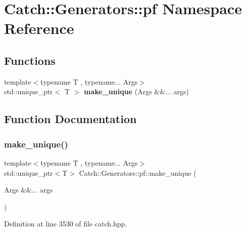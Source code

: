 \section{Catch\+::Generators\+::pf Namespace Reference}
\label{namespace_catch_1_1_generators_1_1pf}
\subsection*{Functions}
\begin{DoxyCompactItemize}
\item 
{\footnotesize template$<$typename T , typename... Args$>$ }\\std\+::unique\+\_\+ptr$<$ T $>$ \textbf{ make\+\_\+unique} (Args \&\&... args)
\end{DoxyCompactItemize}


\subsection{Function Documentation}
\mbox{\label{namespace_catch_1_1_generators_1_1pf_adb71cb1098062f6baaf86ec4feadae7d}} 
\subsubsection{make\_unique()}
{\footnotesize\ttfamily template$<$typename T , typename... Args$>$ \\
std\+::unique\+\_\+ptr$<$T$>$ Catch\+::\+Generators\+::pf\+::make\+\_\+unique (\begin{DoxyParamCaption}\item[{Args \&\&...}]{args }\end{DoxyParamCaption})}



Definition at line 3530 of file catch.\+hpp.

